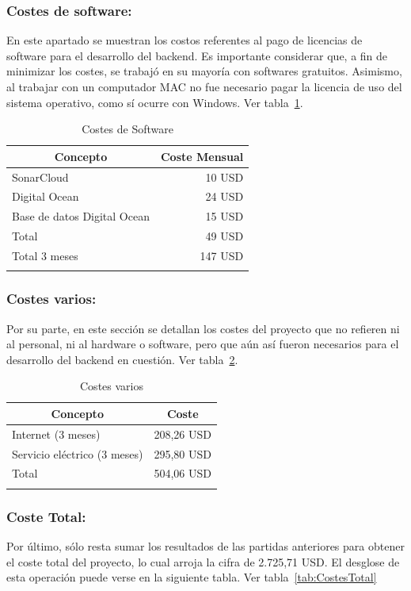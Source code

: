 \subsubsection{Costes de software:}

En este apartado se muestran los costos referentes al pago de licencias de software para el desarrollo del backend. Es importante considerar que, a fin de minimizar los costes, se trabajó en su mayoría con softwares gratuitos. Asimismo, al trabajar con un computador MAC no fue necesario pagar la licencia de uso del sistema operativo, como sí ocurre con Windows. Ver tabla~\ref{tab:CostesSoftware}.
\newpage
\begin{longtable}[c]{@{}lr@{}}
\toprule
\multicolumn{1}{c}{\textbf{Concepto}} & \multicolumn{1}{c}{\textbf{Coste Mensual}} \\* \midrule
\endfirsthead
%
\endhead
%
\bottomrule
\endfoot
%
\endlastfoot
%
SonarCloud & 10 USD \\
Digital Ocean & 24 USD \\
Base de datos Digital Ocean & 15 USD \\
Total & 49 USD \\
Total 3 meses & 147 USD \\ \hline
\caption{Costes de Software}
\label{tab:CostesSoftware}
\end{longtable}

\subsubsection{Costes varios:}
Por su parte, en este sección se detallan los costes del proyecto que no refieren ni al personal, ni al hardware o software, pero que aún así fueron necesarios para el desarrollo del backend en cuestión. Ver tabla~\ref{tab:CostesVarios}.

\begin{longtable}[c]{@{}lr@{}}
\toprule
\multicolumn{1}{c}{\textbf{Concepto}} & \multicolumn{1}{c}{\textbf{Coste}} \\* \midrule
\endfirsthead
%
\endhead
%
\bottomrule
\endfoot
%
\endlastfoot
%
Internet (3 meses) & 208,26 USD \\
Servicio eléctrico (3 meses) & 295,80 USD \\
Total & 504,06 USD \\ \hline
\caption{Costes varios}
\label{tab:CostesVarios}
\end{longtable}

\subsubsection{Coste Total:}
Por último, sólo resta sumar los resultados de las partidas anteriores para obtener el coste total del proyecto, lo cual arroja la cifra de 2.725,71 USD. El desglose de esta operación puede verse en la siguiente tabla. Ver tabla~\ref{tab:CostesTotal}

